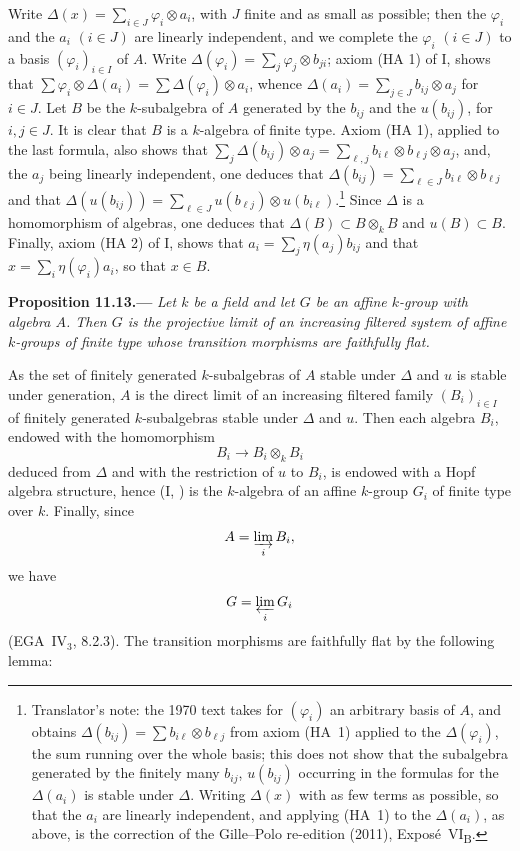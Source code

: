 Write \(\Delta(x)=\sum_{i\in J}\varphi_i\otimes a_i\), with \(J\)
finite and as small as possible; then the \(\varphi_i\) and the
\(a_i\) \((i\in J)\) are linearly independent, and we complete
the \(\varphi_i\) \((i\in J)\) to a basis \((\varphi_i)_{i\in I}\)
of \(A\). Write
\(\Delta(\varphi_i)=\sum_j\varphi_j\otimes b_{ji}\); axiom
\textup{(HA 1)} of I, 
shows that
\(\sum\varphi_i\otimes\Delta(a_i)=\sum\Delta(\varphi_i)\otimes a_i\),
whence \(\Delta(a_i)=\sum_{j\in J}b_{ij}\otimes a_j\) for
\(i\in J\). Let \(B\) be the \(k\)-subalgebra of \(A\) generated
by the \(b_{ij}\) and the \(u(b_{ij})\), for \(i,j\in J\). It is
clear that \(B\) is a \(k\)-algebra of finite type. Axiom
\textup{(HA 1)}, applied to the last formula, also shows that
\(\sum_j\Delta(b_{ij})\otimes a_j
=\sum_{\ell,j}b_{i\ell}\otimes b_{\ell j}\otimes a_j\), and, the
\(a_j\) being linearly independent, one deduces that
\(\Delta(b_{ij})=\sum_{\ell\in J}b_{i\ell}\otimes b_{\ell j}\) and
that
\(\Delta(u(b_{ij}))=\sum_{\ell\in J}u(b_{\ell j})\otimes u(b_{i\ell})\).\footnote{Translator's
note: the 1970 text takes for \((\varphi_i)\) an arbitrary basis of \(A\), and obtains
\(\Delta(b_{ij})=\sum b_{i\ell}\otimes b_{\ell j}\) from axiom (HA~1) applied to the \(\Delta(\varphi_i)\), the sum
running over the whole basis; this does not show that the subalgebra generated by the finitely many \(b_{ij}\),
\(u(b_{ij})\) occurring in the formulas for the \(\Delta(a_i)\) is stable under \(\Delta\). Writing \(\Delta(x)\) with
as few terms as possible, so that the \(a_i\) are linearly independent, and applying (HA~1) to the \(\Delta(a_i)\),
as above, is the correction of the Gille--Polo re-edition (2011), Expos\'e~VI\textsubscript{B}.}
Since \(\Delta\) is a homomorphism of algebras, one deduces that
\(\Delta(B)\subset B\otimes_kB\) and \(u(B)\subset B\). Finally,
axiom \textup{(HA 2)} of I, 
shows that \(a_i=\sum_j\eta(a_j)b_{ij}\) and that
\(x=\sum_i\eta(\varphi_i)a_i\), so that \(x\in B\).

\medskip
{}\label{prop:sga3-VIB-11.13}%
\noindent\textbf{Proposition 11.13.---}
\emph{Let \(k\) be a field and let \(G\) be an affine
\(k\)-group with algebra \(A\). Then \(G\) is the
projective limit of an increasing filtered system of
affine \(k\)-groups of finite type whose transition
morphisms are faithfully flat.}

As the set of finitely generated \(k\)-subalgebras of \(A\)
stable under \(\Delta\) and \(u\) is stable under generation,
\(A\) is the direct limit of an increasing filtered family
\((B_i)_{i\in I}\) of finitely generated \(k\)-subalgebras stable
under \(\Delta\) and \(u\). Then each algebra \(B_i\), endowed
with the homomorphism
\[
  B_i\longrightarrow B_i\otimes_kB_i
\]
deduced from \(\Delta\) and with the restriction of \(u\) to
\(B_i\), is endowed with a Hopf algebra structure, hence
\textup{(}I, \textup{)} is
the \(k\)-algebra of an affine \(k\)-group \(G_i\) of finite type
over \(k\). Finally, since
\[
  A=\varinjlim_i B_i,
\]
we have
\[
  G=\varprojlim_i G_i
\]
\textup{(EGA~IV\(_3\), 8.2.3)}. The transition morphisms are
faithfully flat by the following lemma:

